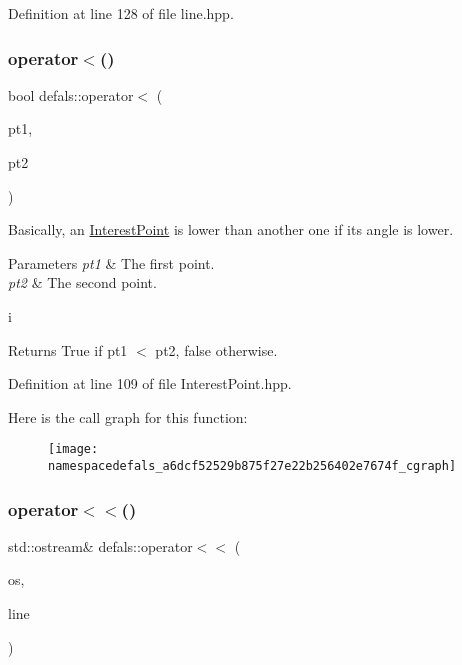 Definition at line 128 of file line.\+hpp.

\mbox{\label{namespacedefals_a6dcf52529b875f27e22b256402e7674f}} 
\subsubsection{\texorpdfstring{operator$<$()}{operator<()}}
{\footnotesize\ttfamily bool defals\+::operator$<$ (\begin{DoxyParamCaption}\item[{const \hyperlink{classdefals_1_1_interest_point}{Interest\+Point} \&}]{pt1,  }\item[{const \hyperlink{classdefals_1_1_interest_point}{Interest\+Point} \&}]{pt2 }\end{DoxyParamCaption})\hspace{0.3cm}{\ttfamily [inline]}}

Basically, an \hyperlink{classdefals_1_1_interest_point}{Interest\+Point} is lower than another one if its angle is lower.


\begin{DoxyParams}{Parameters}
{\em pt1} & The first point. \\
\hline
{\em pt2} & The second point.\\
\hline
\end{DoxyParams}
i\begin{DoxyReturn}{Returns}
True if pt1 $<$ pt2, false otherwise. 
\end{DoxyReturn}


Definition at line 109 of file Interest\+Point.\+hpp.

Here is the call graph for this function\+:\nopagebreak
\begin{figure}[H]
\begin{center}
\leavevmode
\texttt{[image: namespacedefals\_a6dcf52529b875f27e22b256402e7674f\_cgraph]}
\end{center}
\end{figure}
\mbox{\label{namespacedefals_a41fe3a74a9f03aa762cd1723284947f8}} 
\subsubsection{\texorpdfstring{operator$<$$<$()}{operator<<()}}
{\footnotesize\ttfamily std\+::ostream\& defals\+::operator$<$$<$ (\begin{DoxyParamCaption}\item[{std\+::ostream \&}]{os,  }\item[{const \hyperlink{classdefals_1_1_line}{Line} \&}]{line }\end{DoxyParamCaption})\hspace{0.3cm}{\ttfamily [inline]}}



